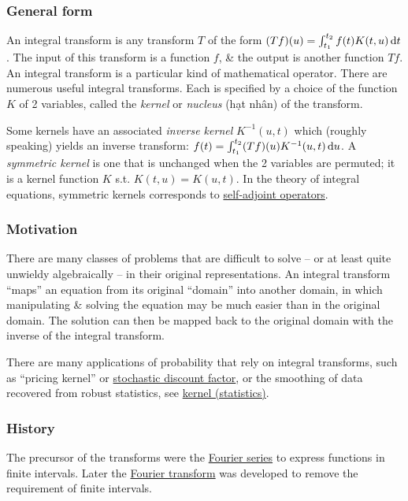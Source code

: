 \documentclass{article}
\begin{document}
\subsubsection{General form}
An integral transform is any transform $T$ of the form $(Tf)(u) = \int_{t_1}^{t_2} f(t)K(t,u)\,{\rm d}t$. The input of this transform is a function $f$, \& the output is another function $Tf$. An integral transform is a particular kind of mathematical operator. There are numerous useful integral transforms. Each is specified by a choice of the function $K$ of 2 variables, called the {\it kernel} or {\it nucleus} (hạt nhân) of the transform.

Some kernels have an associated {\it inverse kernel} $K^{-1}(u,t)$ which (roughly speaking) yields an inverse transform: $f(t) = \int_{t_1}^{t_2} (Tf)(u)K^{-1}(u,t)\,{\rm d}u$. A {\it symmetric kernel} is one that is unchanged when the 2 variables are permuted; it is a kernel function $K$ s.t. $K(t,u) = K(u,t)$. In the theory of integral equations, symmetric kernels corresponds to \href{https://en.wikipedia.org/wiki/Self-adjoint_operators}{self-adjoint operators}.

\subsubsection{Motivation}
There are many classes of problems that are difficult to solve -- or at least quite unwieldy algebraically -- in their original representations. An integral transform ``maps'' an equation from its original ``domain'' into another domain, in which manipulating \& solving the equation may be much easier than in the original domain. The solution can then be mapped back to the original domain with the inverse of the integral transform.

There are many applications of probability that rely on integral transforms, such as ``pricing kernel'' or \href{https://en.wikipedia.org/wiki/Stochastic_discount_factor}{stochastic discount factor}, or the smoothing of data recovered from robust statistics, see \href{https://en.wikipedia.org/wiki/Kernel_(statistics)}{kernel (statistics)}.

\subsubsection{History}
The precursor of the transforms were the \href{https://en.wikipedia.org/wiki/Fourier_series}{Fourier series} to express functions in finite intervals. Later the \href{https://en.wikipedia.org/wiki/Fourier_transform}{Fourier transform} was developed to remove the requirement of finite intervals.
\end{document}

